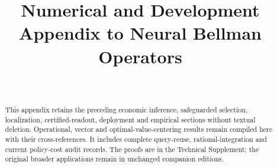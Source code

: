 \documentclass[ecta,nameyear,draft]{econsocart}
\begin{document}
\begin{frontmatter}
\title{Numerical and Development Appendix to Neural Bellman Operators}
\begin{aug}
\author[id=au1,addressref={add1}]{~}
\address[id=add1]{Peking University}
\end{aug}
\begin{abstract}
This appendix retains the preceding economic inference, safeguarded selection, localization, certified-readout, deployment and empirical sections without textual deletion. Operational, vector and optimal-value-centering results remain compiled here with their cross-references. It includes complete query-reuse, rational-integration and current policy-cost audit records. The proofs are in the Technical Supplement; the original broader applications remain in unchanged companion editions.
\end{abstract}
\end{frontmatter}
\appendix
















\end{document}
